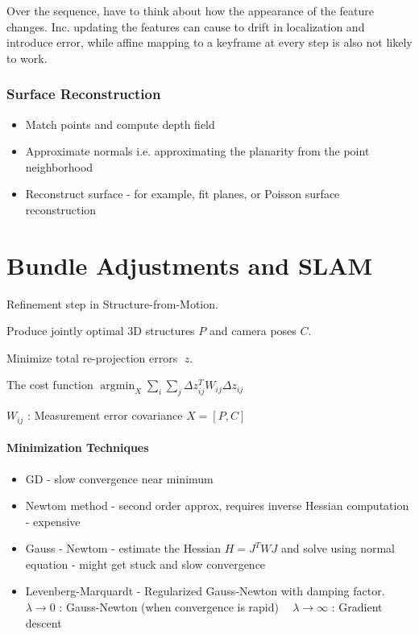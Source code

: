 Over the sequence, have to think about how the appearance of the feature changes.
Inc. updating the features can cause to drift in localization and introduce error, while affine mapping to a keyframe at every step is also not likely to work.


\subsubsection{Surface Reconstruction}

\begin{itemize}
\item Match points and compute depth field
\item Approximate normals i.e. approximating the planarity from the point neighborhood
\item  Reconstruct surface - for example, fit planes, or Poisson surface reconstruction
\end{itemize}

\section{Bundle Adjustments and SLAM}

Refinement step in Structure-from-Motion.

Produce jointly optimal 3D structures $P$ and camera poses $C$.

Minimize total re-projection errors 􏰅$z$.

The cost function $\operatorname{argmin}_X \sum_i \sum_j \Delta z_{ij}^T W_{ij} \Delta z_{ij} $

$W_{ij}$ : Measurement error covariance
$X = [P,C]$


\paragraph{Minimization Techniques}

\begin{itemize}
\item GD - slow convergence near minimum
\item Newtom method - second order approx, requires inverse Hessian computation - expensive
\item Gauss - Newtom - estimate the Hessian $H = J^TWJ$ and solve using normal equation - might get stuck and slow convergence 
\item Levenberg-Marquardt - Regularized Gauss-Newton with damping factor. 
􏰍 􏰎$ \lambda \to 0$ : Gauss-Newton (when convergence is rapid)
􏰍 􏰎$ \lambda \to \infty$ : Gradient descent
\end{itemize}

